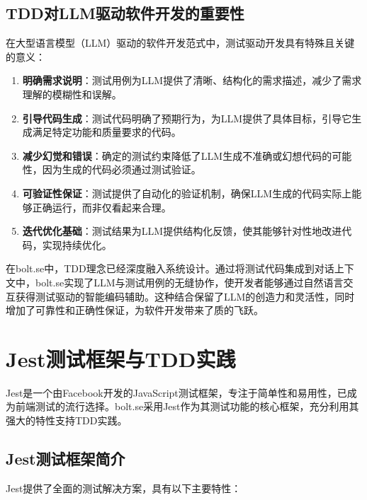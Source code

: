 \subsection{TDD对LLM驱动软件开发的重要性}
在大型语言模型（LLM）驱动的软件开发范式中，测试驱动开发具有特殊且关键的意义\cite{Mathews2024}：

\begin{enumerate}
  \item \textbf{明确需求说明}：测试用例为LLM提供了清晰、结构化的需求描述，减少了需求理解的模糊性和误解。
  
  \item \textbf{引导代码生成}：测试代码明确了预期行为，为LLM提供了具体目标，引导它生成满足特定功能和质量要求的代码。
  
  \item \textbf{减少幻觉和错误}：确定的测试约束降低了LLM生成不准确或幻想代码的可能性，因为生成的代码必须通过测试验证。
  
  \item \textbf{可验证性保证}：测试提供了自动化的验证机制，确保LLM生成的代码实际上能够正确运行，而非仅看起来合理。
  
  \item \textbf{迭代优化基础}：测试结果为LLM提供结构化反馈，使其能够针对性地改进代码，实现持续优化。
\end{enumerate}

在bolt.se中，TDD理念已经深度融入系统设计。通过将测试代码集成到对话上下文中，bolt.se实现了LLM与测试用例的无缝协作，使开发者能够通过自然语言交互获得测试驱动的智能编码辅助。这种结合保留了LLM的创造力和灵活性，同时增加了可靠性和正确性保证，为软件开发带来了质的飞跃。

\section{Jest测试框架与TDD实践}

Jest是一个由Facebook开发的JavaScript测试框架，专注于简单性和易用性，已成为前端测试的流行选择\cite{Jest2023}。bolt.se采用Jest作为其测试功能的核心框架，充分利用其强大的特性支持TDD实践。

\subsection{Jest测试框架简介}

Jest提供了全面的测试解决方案，具有以下主要特性：

